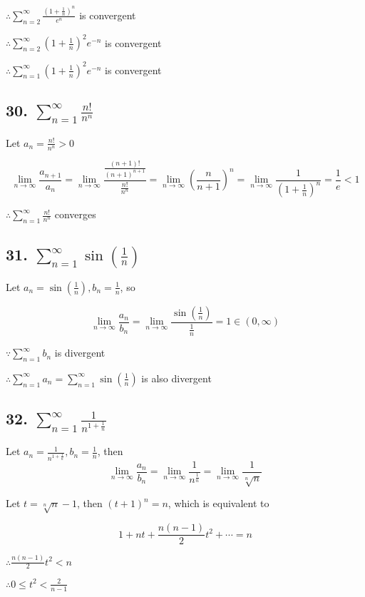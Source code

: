\documentclass{article}
\begin{document}
    $\therefore \sum_{n=2}^\infty \frac{(1+\frac 1 n)^n}{e^n}$ is convergent

    $\therefore \sum_{n=2}^\infty (1+\frac 1 n)^2e^{-n}$ is convergent

    $\therefore \sum_{n=1}^\infty (1+\frac 1 n)^2e^{-n}$ is convergent

    \subsection*{30. $\sum_{n=1}^\infty \frac{n!}{n^n}$}

    Let $a_n = \frac{n!}{n^n} > 0$

    $$\lim_{n\to\infty} \frac{a_{n+1}}{a_n} = \lim_{n\to\infty} \frac{\frac{(n+1)!}{(n+1)^{n+1}}}{\frac{n!}{n^n}} = \lim_{n\to\infty} (\frac{n}{n+1})^n = \lim_{n\to\infty}\frac{1}{(1 + \frac 1 n)^n} = \frac 1 e < 1$$

    $\therefore \sum_{n=1}^\infty \frac{n!}{n^n}$ converges

    \subsection*{31. $\sum_{n=1}^\infty \sin(\frac 1 n)$}

    Let $a_n = \sin(\frac 1 n), b_n = \frac 1 n$, so

    $$\lim_{n\to\infty} \frac{a_n}{b_n} = \lim_{n\to\infty}\frac{\sin(\frac 1 n)}{\frac 1 n} = 1 \in (0, \infty)$$

    $\because \sum_{n=1}^\infty b_n$ is divergent

    $\therefore \sum_{n=1}^\infty a_n = \sum_{n=1}^\infty \sin(\frac 1 n)$ is also divergent

    \subsection*{32. $\sum_{n=1}^\infty \frac{1}{n^{1+\frac 1 n }}$}

    Let $a_n = \frac{1}{n^{1+\frac 1 n}}, b_n = \frac{1}{n}$, then $$\lim_{n\to\infty} \frac{a_n}{b_n} = \lim_{n\to\infty}\frac{1}{n^{\frac 1 n}} = \lim_{n\to\infty}\frac{1}{\sqrt[n]{n}}$$

    Let $t=\sqrt[n] n - 1$, then $(t+1)^n = n$, which is equivalent to

    $$1 + nt + \frac{n(n-1)}{2}t^2 + \cdots = n$$

    $\therefore \frac{n(n-1)}{2}t^2 < n$

    $\therefore 0 \leq t^2 < \frac{2}{n-1}$
\end{document}
